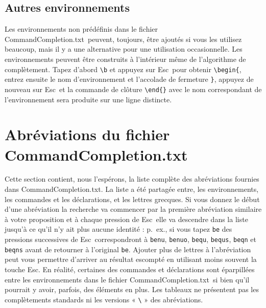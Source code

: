 \documentclass[11pt,french]{article}
\newcommand{\esckey}{\textsf{Esc}}
\newcommand{\CCT}{\textsf{CommandCompletion.txt}}
\begin{document}
\subsection*{Autres environnements}

Les environnements non prédéfinis dans le fichier \CCT\ peuvent, toujours, être ajoutés si vous les utilisez beaucoup, mais il y a une alternative pour une utilisation occasionnelle. Les environnements peuvent être construits à l'intérieur même de l'algorithme de complètement. Tapez d'abord \verb|\b| et appuyez sur \esckey\ pour obtenir \verb|\begin{|, entrez ensuite le nom d'environnement et l'accolade de fermeture \texttt{\}}, appuyez de nouveau sur \esckey\ et la commande de clôture \verb|\end{}| avec le nom correspondant de l'environnement sera produite sur une ligne distincte.


\section*{Abréviations du fichier \CCT}

Cette section contient, nous l'espérons, la liste complète des abréviations fournies dans \CCT. La liste a été partagée entre, les environnements, les commandes et les déclarations, et les lettres grecques. Si vous donnez le début d'une abréviation la recherche va commencer par la première abréviation similaire à votre proposition et à chaque pression de \esckey\ elle va descendre dans la liste jusqu'à ce qu'il n'y ait plus aucune identité : p.~ex., si vous tapez \texttt{be} des pressions successives de \esckey\ correspondront à \texttt{benu}, \texttt{benuo}, \texttt{bequ}, \texttt{bequs}, \texttt{beqn} et \texttt{beqns} avant de retourner à l'original \texttt{be}. Ajouter plus de lettres à l'abréviation peut vous permettre d'arriver au résultat escompté en utilisant moins souvent la touche \esckey. En réalité, certaines des commandes et déclarations sont éparpillées entre les environnements dans le fichier \CCT\ si bien qu'il pourrait y avoir, parfois, des éléments en plus. Les tableaux ne présentent pas les complètements standards ni les versions « \verb"\" » des abréviations.%
\end{document}
